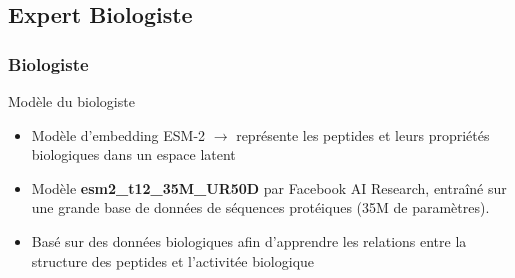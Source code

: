 \subsection{Expert Biologiste}
\begin{frame}
    \frametitle{Biologiste}
    \begin{block}{Modèle du biologiste}
        \begin{itemize}
        \item Modèle d'embedding ESM-2 $\rightarrow$ représente les peptides et leurs propriétés biologiques dans un espace latent
        \item Modèle \textbf{esm2\_t12\_35M\_UR50D} par Facebook AI Research, entraîné sur une grande base de données de séquences protéiques (35M de paramètres).
        \item Basé sur des données biologiques afin d'apprendre les relations entre la structure des peptides et l'activitée biologique
        \end{itemize}
    \end{block}
\end{frame}